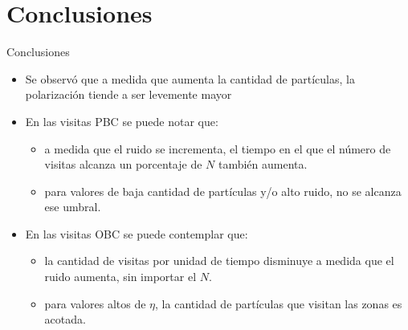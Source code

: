 \documentclass{beamer}
\begin{document}
    \section{Conclusiones}

        \begin{frame}{Conclusiones}
            \begin{itemize}
                \item Se observó que a medida que aumenta la cantidad de partículas, la polarización tiende a ser
                levemente mayor
                \item En las visitas PBC se puede notar que:
                \begin{itemize}
                    \item a medida que el ruido se incrementa, el tiempo en el que el número de visitas alcanza un
                    porcentaje de $N$ también aumenta.
                    \item para valores de baja cantidad de partículas y/o alto ruido, no se alcanza ese umbral.
                \end{itemize}
                \item En las visitas OBC se puede contemplar que:
                \begin{itemize}
                    \item la cantidad de visitas por unidad de tiempo disminuye a medida que el ruido aumenta, sin importar el $N$.
                    \item para valores altos de $\eta$, la cantidad de partículas que visitan las zonas es acotada.
                \end{itemize}
            \end{itemize}
        \end{frame}
\end{document}
